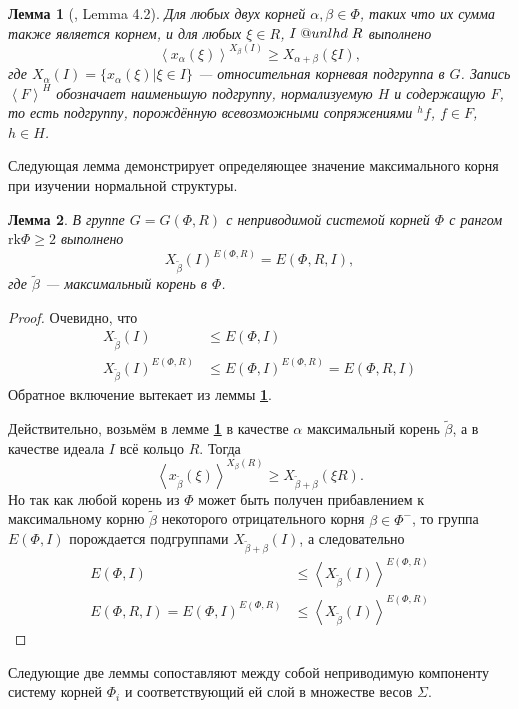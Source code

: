 \documentclass[12pt]{matmex-diploma}
\makeatletter
\newcommand{\slunlhd}{%
  \mathrel{\mathpalette\sl@unlhd\relax}%
}
\newcommand{\sl@unlhd}[2]{%
  \sbox\z@{$#1\lhd$}%
  \sbox\tw@{$#1\leqslant$}%
  \dimen@=\ht\tw@
  \advance\dimen@-\ht\z@
  \ifx#1\displaystyle
    \advance\dimen@ .2pt
  \else
    \ifx#1\textstyle
      \advance\dimen@ .2pt
    \fi
  \fi
  \ooalign{\raisebox{\dimen@}{$\m@th#1\lhd$}\cr$\m@th#1\leqslant$\cr}%
}
\theoremstyle{mystyleni}
\theoremstyle{mystyle}
\newtheorem{lm}{Лемма}
\newcommand\refb[1]{\textbf{\ref{#1}}}
\renewcommand{\le}{\leqslant}
\renewcommand{\ge}{\geqslant}
\renewcommand{\trianglelefteq}{\slunlhd}
\makeatother
\begin{document}
\begin{lm}[\citep{Stavrova2009}, Lemma 4.2]
  \label{transitivity}
  Для любых двух корней $\alpha, \beta \in \Phi$, таких что их сумма также является корнем, и для любых  $\xi \in R$, $I \trianglelefteq R$ выполнено
  $$ \left< x_\alpha(\xi) \right>^{X_\beta(I)} \ge X_{\alpha + \beta}(\xi I), $$  
  где $X_\alpha(I) = \{x_\alpha(\xi) | \xi \in I\}$ --- относительная корневая подгруппа в $G$. Запись $\left<F\right>^H$ обозначает наименьшую подгруппу, нормализуемую $H$ и содержащую $F$, то есть подгруппу, порождённую всевозможными сопряжениями $^hf$, $f \in F$, $h \in H$.
\end{lm}

Следующая лемма демонстрирует определяющее значение максимального корня при изучении нормальной структуры.

\begin{lm} \label{maximalgenerates}
  В группе $G=G(\Phi,R)$ с неприводимой системой корней $\Phi$ с рангом $\mathrm{rk}\Phi \ge 2$ выполнено
  $$X_{\widetilde\beta}(I)^{E(\Phi,R)} = E(\Phi,R,I),$$
  где $\widetilde\beta$ --- максимальный корень в $\Phi$.
\end{lm}
\begin{proof}
  Очевидно, что
\begin{align*}
  X_{\widetilde\beta}(I) &\le E(\Phi,I) \\
  X_{\widetilde\beta}(I)^{E(\Phi,R)} &\le E(\Phi,I)^{E(\Phi,R)} = E(\Phi,R,I)
\end{align*}
  Обратное включение вытекает из леммы \refb{transitivity}.
  
  Действительно, возьмём в лемме \refb{transitivity} в качестве $\alpha$ максимальный корень $\widetilde{\beta}$, а в качестве идеала $I$ всё кольцо $R$. Тогда
  $$ \left< x_{\widetilde\beta}(\xi) \right>^{X_\beta(R)} \ge X_{\widetilde\beta + \beta}(\xi R). $$
  Но так как любой корень из $\Phi$ может быть получен прибавлением к максимальному корню $\widetilde\beta$ некоторого отрицательного корня $\beta \in \Phi^-$, то группа $E(\Phi,I)$ порождается подгруппами $X_{\widetilde\beta + \beta}(I)$, а следовательно 
\begin{align*}
E(\Phi,I) &\le \left< X_{\widetilde\beta}(I) \right>^{E(\Phi,R)}\\
  E(\Phi,R,I) = E(\Phi,I)^{E(\Phi,R)} &\le \left< X_{\widetilde\beta}(I) \right>^{E(\Phi,R)}
\end{align*}
\end{proof}

Следующие две леммы сопоставляют между собой неприводимую компоненту систему корней $\Phi_i$ и соответствующий ей слой в множестве весов $\Sigma$.
\end{document}
